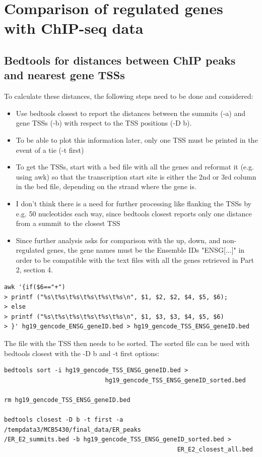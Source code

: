 \documentclass[a4paper,11pt]{article}
\begin{document}
\section{Comparison of regulated genes with ChIP-seq data}
\subsection{Bedtools for distances between ChIP peaks and nearest gene TSSs}
To calculate these distances, the following steps need to be done and considered:

\begin{itemize}
\item Use bedtools closest to report the distances between the summits (-a) and gene TSSs (-b) with respect to the TSS positions (-D b).
\item To be able to plot this information later, only one TSS must be printed in the event of a tie (-t first)
\item To get the TSSs, start with a bed file with all the genes and reformat it (e.g. using awk) so that the transcription start site is either the 2nd or 3rd column in the bed file, depending on the strand where the gene is.
\item I don't think there is a need for further processing like flanking the TSSs by e.g. 50 nucleotides each way, since bedtools closest reports only one distance from a summit to the closest TSS
\item Since further analysis asks for comparison with the up, down, and non-regulated genes, the gene names must be the Ensemble IDs "ENSG[...]" in order to be compatible with the text files with all the genes retrieved in Part 2, section 4.
\end{itemize}

\begin{verbatim}
awk '{if($6=="+")
> printf ("%s\t%s\t%s\t%s\t%s\t%s\n", $1, $2, $2, $4, $5, $6);
> else
> printf ("%s\t%s\t%s\t%s\t%s\t%s\n", $1, $3, $3, $4, $5, $6)
> }' hg19_gencode_ENSG_geneID.bed > hg19_gencode_TSS_ENSG_geneID.bed
\end{verbatim}

The file with the TSS then needs to be sorted. The sorted file can be used with bedtools closest with the -D b and -t first options:\\

\begin{verbatim}
bedtools sort -i hg19_gencode_TSS_ENSG_geneID.bed > 
                            hg19_gencode_TSS_ENSG_geneID_sorted.bed

rm hg19_gencode_TSS_ENSG_geneID.bed

bedtools closest -D b -t first -a /tempdata3/MCB5430/final_data/ER_peaks
/ER_E2_summits.bed -b hg19_gencode_TSS_ENSG_geneID_sorted.bed > 
                                                ER_E2_closest_all.bed
\end{verbatim}
\end{document}

